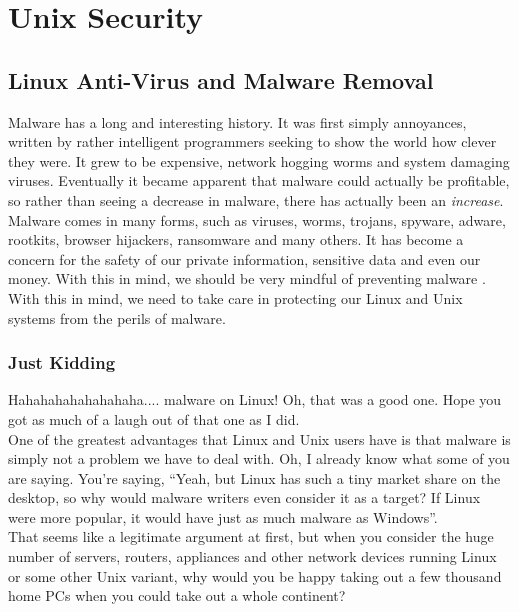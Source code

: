 \chapter{Unix Security}

\section{Linux Anti-Virus and Malware Removal}

Malware has a long and interesting history.  It was first simply annoyances, written by rather intelligent programmers seeking to show the world how clever they were.  It grew to be expensive, network hogging worms and system damaging viruses.  Eventually it became apparent that malware could actually be profitable, so rather than seeing a decrease in malware, there has actually been an \textit{increase}.\\

Malware comes in many forms, such as viruses, worms, trojans, spyware, adware, rootkits, browser hijackers, ransomware and many others.  It has become a concern for the safety of our private information, sensitive data and even our money.  With this in mind, we should be very mindful of preventing malware .\\

With this in mind, we need to take care in protecting our Linux and Unix systems from the perils of malware.\\

\subsection{Just Kidding}

Hahahahahahahahaha.... malware on Linux! Oh, that was a good one.  Hope you got as much of a laugh out of that one as I did.\\

One of the greatest advantages that Linux and Unix users have is that malware is simply not a problem we have to deal with.  Oh, I already know what some of you are saying.  You're saying, ``Yeah, but Linux has such a tiny market share on the desktop, so why would malware writers even consider it as a target?  If Linux were more popular, it would have just as much malware as Windows''.\\

That seems like a legitimate argument at first, but when you consider the huge number of servers, routers, appliances and other network devices running Linux or some other Unix variant, why would you be happy taking out a few thousand home PCs when you could take out a whole continent?\\

